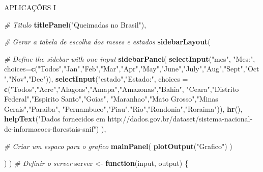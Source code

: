 \documentclass[
  ignorenonframetext,
]{beamer}
\newenvironment{Shaded}{\begin{snugshade}}{\end{snugshade}}
\newcommand{\CommentTok}[1]{\textcolor[rgb]{0.56,0.35,0.01}{\textit{#1}}}
\newcommand{\ControlFlowTok}[1]{\textcolor[rgb]{0.13,0.29,0.53}{\textbf{#1}}}
\newcommand{\DataTypeTok}[1]{\textcolor[rgb]{0.13,0.29,0.53}{#1}}
\newcommand{\KeywordTok}[1]{\textcolor[rgb]{0.13,0.29,0.53}{\textbf{#1}}}
\newcommand{\NormalTok}[1]{#1}
\newcommand{\StringTok}[1]{\textcolor[rgb]{0.31,0.60,0.02}{#1}}
\begin{document}
\begin{frame}[fragile]{APLICAÇÕES I}
\begin{Shaded}
\begin{Highlighting}[]
{{  \CommentTok{# Titulo}
  \KeywordTok{titlePanel}\NormalTok{(}\StringTok{"Queimadas no Brasil"}\NormalTok{),}
  
  \CommentTok{# Gerar a tabela de escolha dos meses e estados}
  \KeywordTok{sidebarLayout}\NormalTok{(      }
    
    \CommentTok{# Define the sidebar with one input}
    \KeywordTok{sidebarPanel}\NormalTok{(}
      \KeywordTok{selectInput}\NormalTok{(}\StringTok{"mes"}\NormalTok{, }\StringTok{"Mes:"}\NormalTok{, }
                  \DataTypeTok{choices=}\KeywordTok{c}\NormalTok{(}\StringTok{"Todos"}\NormalTok{,}\StringTok{"Jan"}\NormalTok{,}\StringTok{"Feb"}\NormalTok{,}\StringTok{"Mar"}\NormalTok{,}\StringTok{"Apr"}\NormalTok{,}\StringTok{"May"}\NormalTok{,}\StringTok{"June"}\NormalTok{,}\StringTok{"July"}\NormalTok{,}\StringTok{"Aug"}\NormalTok{,}\StringTok{"Sept"}\NormalTok{,}\StringTok{"Oct"}\NormalTok{,}\StringTok{"Nov"}\NormalTok{,}\StringTok{"Dec"}\NormalTok{)),}
      \KeywordTok{selectInput}\NormalTok{(}\StringTok{"estado"}\NormalTok{,}\StringTok{"Estado:"}\NormalTok{,}
                  \DataTypeTok{choices =} \KeywordTok{c}\NormalTok{(}\StringTok{"Todos"}\NormalTok{,}\StringTok{"Acre"}\NormalTok{,}\StringTok{"Alagoas"}\NormalTok{,}\StringTok{"Amapa"}\NormalTok{,}\StringTok{"Amazonas"}\NormalTok{,}\StringTok{"Bahia"}\NormalTok{,}
                              \StringTok{"Ceara"}\NormalTok{,}\StringTok{"Distrito Federal"}\NormalTok{,}\StringTok{"Espirito Santo"}\NormalTok{,}\StringTok{"Goias"}\NormalTok{,}
                              \StringTok{"Maranhao"}\NormalTok{,}\StringTok{"Mato Grosso"}\NormalTok{,}\StringTok{"Minas Gerais"}\NormalTok{,}\StringTok{"Paraiba"}\NormalTok{,}
                              \StringTok{"Pernambuco"}\NormalTok{,}\StringTok{"Piau"}\NormalTok{,}\StringTok{"Rio"}\NormalTok{,}\StringTok{"Rondonia"}\NormalTok{,}\StringTok{"Roraima"}\NormalTok{)),}
      \KeywordTok{hr}\NormalTok{(),}
      \KeywordTok{helpText}\NormalTok{(}\StringTok{"Dados fornecidos em }
\StringTok{               http://dados.gov.br/dataset/sistema-nacional-de-informacoes-florestais-snif"}\NormalTok{)}
\NormalTok{      ),}
    
    \CommentTok{# Criar um espaco para o grafico}
    \KeywordTok{mainPanel}\NormalTok{(}
      \KeywordTok{plotOutput}\NormalTok{(}\StringTok{"Grafico"}\NormalTok{)  }
\NormalTok{    )}
    
\NormalTok{    )}
\NormalTok{)}
\CommentTok{# Definir o server}
\NormalTok{server <-}\StringTok{ }\ControlFlowTok{function}\NormalTok{(input, output) \{}
  
}}
\end{Highlighting}
\end{Shaded}
\end{frame}
\end{document}
